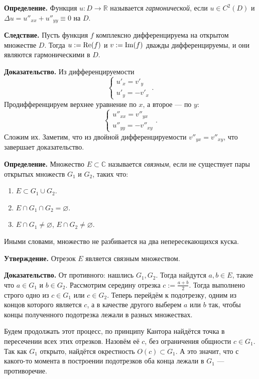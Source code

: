 \textbf{Определение.} Функция $u: D \to \mathbb R$ называется \textit{гармонической}, если $u \in C^2(D)$ и $\Delta u = u''_{xx} + u''_{yy} \equiv 0$ на $D$.

\textbf{Следствие.} Пусть функция $f$ комплексно дифференцируема на открытом множестве $D$.
Тогда $u := \operatorname{Re}(f)$ и $v := \operatorname{Im}(f)$ дважды дифференцируемы, и они являются гармоническими в $D$.

\textbf{Доказательство.} Из дифференцируемости
\[
    \begin{cases}
        u'_x = v'_y \\
        u'_y = -v'_x
    \end{cases} .
\]
Продифференцируем верхнее уравнение по $x$, а второе --- по $y$:
\[
    \begin{cases}
        u''_{xx} = v''_{yx} \\
        u''_{yy} = -v''_{xy}
    \end{cases} .
\]
Сложим их. Заметим, что из двойной дифференцируемости $v''_{yx} = v''_{xy}$, что завершает доказательство.

\QED

\textbf{Определение.} Множество $E \subset {\mathbb C}$ называется \textit{связным}, если не существует пары открытых множеств $G_1$ и $G_2$, таких что:
\begin{enumerate}
    \item $E \subset G_1 \cup G_2$.
    \item $E \cap G_1 \cap G_2 = \varnothing$.
    \item $E \cap G_1 \ne \varnothing$, $E \cap G_2 \ne \varnothing$.
\end{enumerate}
Иными словами, множество не разбивается на два непересекающихся куска.

\textbf{Утверждение.} Отрезок $E$ является связным множеством.

\textbf{Доказательство.} От противного: нашлись $G_1, G_2$.
Тогда найдутся $a, b \in E$, такие что $a \in G_1$ и $b \in G_2$.
Рассмотрим середину отрезка $c := \frac{a + b}{2}$.
Тогда выполнено строго одно из $c \in G_1$ или $c \in G_2$.
Теперь перейдём к подотрезку, одним из концов которого является $c$, а в качестве другого выберем $a$ или $b$ так, чтобы концы полученного подотрезка лежали в разных множествах.

Будем продолжать этот процесс, по принципу Кантора найдётся точка в пересечении всех этих отрезков.
Назовём её $c$, без ограничения общности $c \in G_1$.
Так как $G_1$ открыто, найдётся окрестность $O(c) \subset G_1$.
А это значит, что с какого-то момента в построении подотрезков оба конца лежали в $G_1$ --- противоречие.


